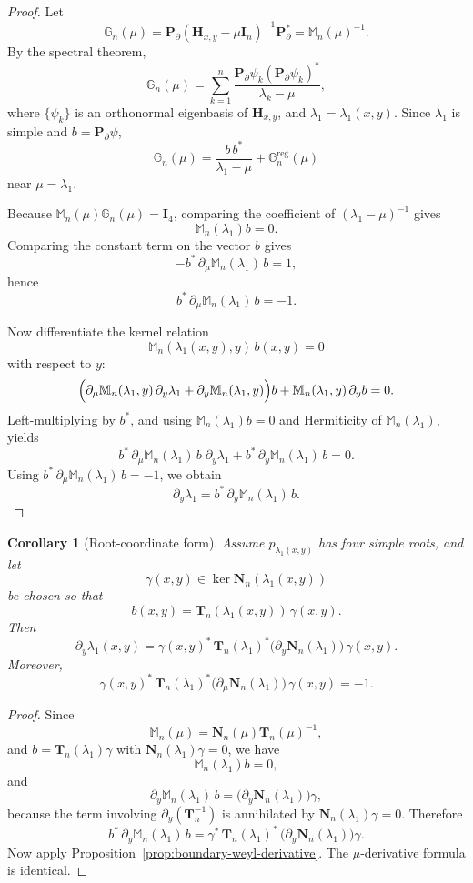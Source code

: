 \documentclass[11pt]{article}
\newtheorem{corollary}[theorem]{Corollary}
\begin{document}
\begin{proof}
Let
\[
\mathbb G_n(\mu)=\mathbf P_\partial(\mathbf H_{x,y}-\mu\mathbf I_n)^{-1}\mathbf P_\partial^*
=\mathbb M_n(\mu)^{-1}.
\]
By the spectral theorem,
\[
\mathbb G_n(\mu)
=
\sum_{k=1}^n
\frac{\mathbf P_\partial \psi_k(\mathbf P_\partial \psi_k)^*}{\lambda_k-\mu},
\]
where \(\{\psi_k\}\) is an orthonormal eigenbasis of \(\mathbf H_{x,y}\), and
\(\lambda_1=\lambda_1(x,y)\). Since \(\lambda_1\) is simple and
\(b=\mathbf P_\partial \psi\),
\[
\mathbb G_n(\mu)
=
\frac{b\,b^*}{\lambda_1-\mu}
+
\mathbb G_n^{\mathrm{reg}}(\mu)
\]
near \(\mu=\lambda_1\).

Because \(\mathbb M_n(\mu)\mathbb G_n(\mu)=\mathbf I_4\), comparing the coefficient of
\((\lambda_1-\mu)^{-1}\) gives
\[
\mathbb M_n(\lambda_1)b=0.
\]
Comparing the constant term on the vector \(b\) gives
\[
-b^*\,\partial_\mu \mathbb M_n(\lambda_1)\,b=1,
\]
hence
\[
b^*\,\partial_\mu \mathbb M_n(\lambda_1)\,b=-1.
\]

Now differentiate the kernel relation
\[
\mathbb M_n(\lambda_1(x,y),y)\,b(x,y)=0
\]
with respect to \(y\):
\[
\Bigl(\partial_\mu \mathbb M_n(\lambda_1,y)\,\partial_y\lambda_1
+\partial_y\mathbb M_n(\lambda_1,y)\Bigr)b
+
\mathbb M_n(\lambda_1,y)\,\partial_y b
=0.
\]
Left-multiplying by \(b^*\), and using \(\mathbb M_n(\lambda_1)b=0\) and Hermiticity of
\(\mathbb M_n(\lambda_1)\), yields
\[
b^*\,\partial_\mu \mathbb M_n(\lambda_1)\,b\;\partial_y\lambda_1
+
b^*\,\partial_y \mathbb M_n(\lambda_1)\,b
=0.
\]
Using \(b^*\,\partial_\mu \mathbb M_n(\lambda_1)\,b=-1\), we obtain
\[
\partial_y\lambda_1=b^*\,\partial_y \mathbb M_n(\lambda_1)\,b.
\]
\end{proof}

\begin{corollary}[Root-coordinate form]\label{cor:root-coordinate-derivative}
Assume \(p_{\lambda_1(x,y)}\) has four simple roots, and let
\[
\gamma(x,y)\in\ker \mathbf N_n(\lambda_1(x,y))
\]
be chosen so that
\[
b(x,y)=\mathbf T_n(\lambda_1(x,y))\,\gamma(x,y).
\]
Then
\[
\boxed{
\partial_y\lambda_1(x,y)
=
\gamma(x,y)^*\,\mathbf T_n(\lambda_1)^*
\bigl(\partial_y \mathbf N_n(\lambda_1)\bigr)\,
\gamma(x,y).
}
\]
Moreover,
\[
\boxed{
\gamma(x,y)^*\,\mathbf T_n(\lambda_1)^*
\bigl(\partial_\mu \mathbf N_n(\lambda_1)\bigr)\,
\gamma(x,y)
=
-1.
}
\]
\end{corollary}

\begin{proof}
Since
\[
\mathbb M_n(\mu)=\mathbf N_n(\mu)\mathbf T_n(\mu)^{-1},
\]
and \(b=\mathbf T_n(\lambda_1)\gamma\) with \(\mathbf N_n(\lambda_1)\gamma=0\), we have
\[
\mathbb M_n(\lambda_1)b=0,
\]
and
\[
\partial_y\mathbb M_n(\lambda_1)\,b
=
\bigl(\partial_y\mathbf N_n(\lambda_1)\bigr)\gamma,
\]
because the term involving \(\partial_y(\mathbf T_n^{-1})\) is annihilated by
\(\mathbf N_n(\lambda_1)\gamma=0\). Therefore
\[
b^*\,\partial_y\mathbb M_n(\lambda_1)\,b
=
\gamma^*\,\mathbf T_n(\lambda_1)^*\,
\bigl(\partial_y\mathbf N_n(\lambda_1)\bigr)\gamma.
\]
Now apply Proposition~\ref{prop:boundary-weyl-derivative}. The \(\mu\)-derivative formula is identical.
\end{proof}
\end{document}
